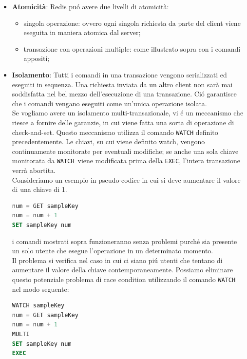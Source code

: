 \begin{itemize}
    \item \textbf{Atomicità}: Redis puó avere due livelli di atomicità:
      \begin{itemize}
          \item singola operazione: ovvero ogni singola richiesta da parte del client viene eseguita in maniera atomica dal server;
          \item transazione con operazioni multiple: come illustrato sopra con i comandi appositi;
      \end{itemize}

    \item \textbf{Isolamento}:
    Tutti i comandi in una transazione vengono serializzati ed eseguiti in sequenza. Una richiesta inviata da un altro client
    non sarà mai soddisfatta nel bel mezzo dell'esecuzione di una transazione. Ció garantisce che i comandi vengano eseguiti
    come un'unica operazione isolata.\\
    Se vogliamo avere un isolamento multi-transazionale, vi é un meccanismo che riesce a fornire delle garanzie, in cui viene fatta una sorta di operazione
    di check-and-set.
    Questo meccanismo utilizza il comando \texttt{WATCH} definito precedentemente.
    Le chiavi, su cui viene definito watch, vengono continuamente monitorate per eventuali modifiche; se anche una sola chiave monitorata
    da \texttt{WATCH }viene modificata prima della \texttt{EXEC}, l'intera transazione verrà abortita.\\

    Consideriamo un esempio in pseudo-codice in cui si deve aumentare il valore di una chiave di 1.

    \begin{lstlisting}[autogobble, style=redis-cli, language=SQL]
num = GET sampleKey
num = num + 1
SET sampleKey num\end{lstlisting}

    i comandi mostrati sopra funzioneranno senza problemi purché sia presente un solo utente che esegue l'operazione in un determinato momento.\\
    Il problema si verifica nel caso in cui ci siano piú utenti che tentano di aumentare il valore della chiave contemporaneamente.
    Possiamo eliminare questo potenziale problema di race condition utilizzando il comando \texttt{WATCH} nel modo seguente:

    \begin{lstlisting}[autogobble, style=redis-cli, language=SQL]
WATCH sampleKey
num = GET sampleKey
num = num + 1
MULTI
SET sampleKey num
EXEC\end{lstlisting}


\end{itemize}
